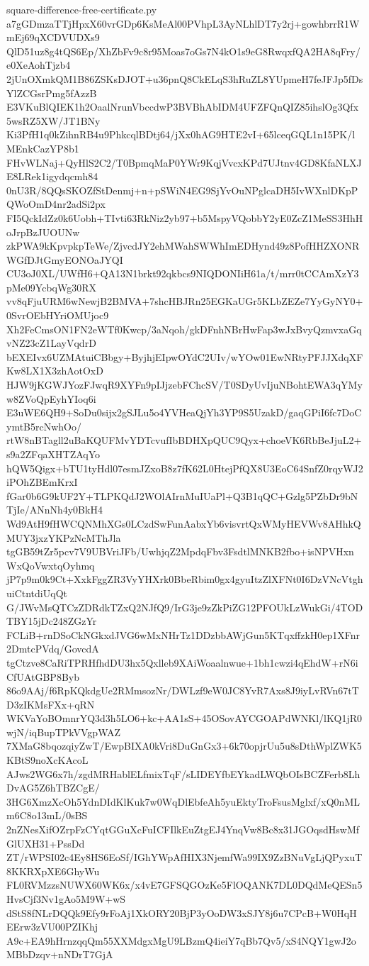 \documentclass[11pt]{article}
\theoremstyle{definition}
\theoremstyle{remark}
\begin{document}
\begin{filecontents*}[overwrite]{square-difference-free-certificate.py}
a7gGDmzaTTjHpxX60vrGDp6KsMeAl00PVhpL3AyNLhlDT7y2rj+gowhbrrR1WmEj69qXCDVUDXs9
QlD51uz8g4tQS6Ep/XhZbFv9c8r95Moas7oGs7N4kO1s9eG8RwqxfQA2HA8qFry/e0XeAohTjzb4
2jUnOXmkQM1B86ZSKsDJOT+u36pnQ8CkELqS3hRuZL8YUpmeH7feJFJp5fDsYlZCGsrPmg5fAzzB
E3VKuBlQIEK1h2OaalNrunVbccdwP3BVBhAbIDM4UFZFQnQIZ85ihslOg3Qfx5wsRZ5XW/JT1BNy
Ki3PfH1q0kZihnRB4u9PhkcqlBDtj64/jXx0hAG9HTE2vI+65lceqGQL1n15PK/lMEnkCazYP8b1
FHvWLNaj+QyHlS2C2/T0BpmqMaP0YWr9KqjVvcxKPd7UJtnv4GD8KfaNLXJE8LRek1igydqcmh84
0nU3R/8QQsSKOZfStDenmj+n+pSWiN4EG9SjYvOuNPglcaDH5IvWXnlDKpPQWoOmD4nr2adSi2px
FI5QckIdZz0k6Uobh+TIvti63RkNiz2yb97+b5MspyVQobbY2yE0ZcZ1MeSS3HhHoJrpBzJUOUNw
zkPWA9kKpvpkpTeWe/ZjvcdJY2ehMWahSWWhImEDHynd49z8PofHHZXONRWGfDJtGmyEONOaJYQI
CU3oJ0XL/UWfH6+QA13N1brkt92qkbcs9NIQDONIiH61a/t/mrr0tCCAmXzY3pMe09YcbqWg30RX
vv8qFjuURM6wNewjB2BMVA+7shcHBJRn25EGKaUGr5KLbZEZe7YyGyNY0+0SvrOEbHYriOMUjoc9
Xh2FeCmsON1FN2eWTf0Kwcp/3aNqoh/gkDFnhNBrHwFap3wJxBvyQzmvxaGqvNZ23cZ1LayVqdrD
bEXEIvx6UZMAtuiCBbgy+ByjhjEIpwOYdC2UIv/wYOw01EwNRtyPFJJXdqXFKw8LX1X3zhAotOxD
HJW9jKGWJYozFJwqR9XYFn9pIJjzebFChcSV/T0SDyUvIjuNBohtEWA3qYMyw8ZVoQpEyhYIoq6i
E3uWE6QH9+SoDu0sijx2gSJLu5o4YVHeaQjYh3YP9S5UzakD/gaqGPiI6fc7DoCymtB5rcNwhOo/
rtW8nBTagll2uBaKQUFMvYDTcvufIbBDHXpQUC9Qyx+choeVK6RbBeJjuL2+s9a2ZFqaXHTZAqYo
hQW5Qigx+bTU1tyHdl07esmJZxoB8z7fK62L0HtejPfQX8U3EoC64SnfZ0rqyWJ2iPOhZBEmKrxI
fGar0b6G9kUF2Y+TLPKQdJ2WOlAIrnMuIUaPl+Q3B1qQC+Gzlg5PZbDr9bNTjIe/ANnNh4y0BkH4
Wd9AtH9fHWCQNMhXGs0LCzdSwFunAabxYb6visvrtQxWMyHEVWv8AHhkQMUY3jxzYKPzNcMThJla
tgGB59tZr5pcv7V9UBVriJFb/UwhjqZ2MpdqFbv3FsdtlMNKB2fbo+isNPVHxnWxQoVwxtqOyhmq
jP7p9m0k9Ct+XxkFggZR3VyYHXrk0BbeRbim0gx4gyuItzZlXFNt0I6DzVNcVtghuiCtntdiUqQt
G/JWvMsQTCzZDRdkTZxQ2NJfQ9/IrG3je9zZkPiZG12PFOUkLzWukGi/4TODTBY15jDc248ZGzYr
FCLiB+rnDSoCkNGkxdJVG6wMxNHrTz1DDzbbAWjGun5KTqxffzkH0ep1XFnr2DmtcPVdq/GovcdA
tgCtzve8CaRiTPRHfhdDU3hx5Qxlleb9XAiWoaalnwue+1bh1cwzi4qEhdW+rN6iCfUAtGBP8Byb
86o9AAj/f6RpKQkdgUe2RMmsozNr/DWLzf9eW0JC8YvR7Axs8J9iyLvRVn67tTD3zIKMsFXx+qRN
WKVaYoBOmnrYQ3d3h5LO6+kc+AA1sS+45OSovAYCGOAPdWNKl/lKQ1jR0wjN/iqBupTPkVVgpWAZ
7XMaG8bqozqiyZwT/EwpBIXA0kVri8DuGnGx3+6k70opjrUu5u8sDthWplZWK5KBtS9noXcKAcoL
AJws2WG6x7h/zgdMRHablELfmixTqF/sLIDEYfbEYkadLWQbOIsBCZFerb8LhDvAG5Z6hTBZCgE/
3HG6XmzXcOh5YdnDIdKlKuk7w0WqDlEbfeAh5yuEktyTroFsusMglxf/xQ0nMLm6C8o13mL/0sBS
2nZNesXifOZrpFzCYqtGGuXcFuICFIlkEuZtgEJ4YnqVw8Bc8x31JGOqsdHswMfGlUXH31+PssDd
ZT/rWPSI02c4Ey8HS6EoSf/IGhYWpAfHIX3NjemfWa99IX9ZzBNuVgLjQPyxuT8KKRXpXE6GhyWu
FL0RVMzzsNUWX60WK6x/x4vE7GFSQGOzKe5FlOQANK7DL0DQdMeQESn5HvsCjf3Nv1gAo5M9W+wS
dStS8fNLrDQQk9Efy9rFoAj1XkORY20BjP3yOoDW3xSJY8j6u7CPcB+W0HqHEErw3zVU00PZIKhj
A9c+EA9hHrnzqqQm55XXMdgxMgU9LBzmQ4ieiY7qBb7Qv5/xS4NQY1gwJ2oMBbDzqv+nNDrT7GjA

\end{filecontents*}
\end{document}

